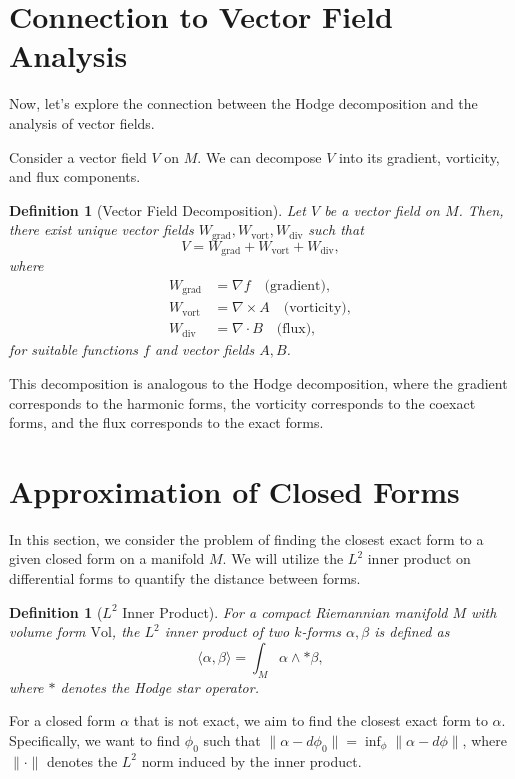 \documentclass[12pt]{article}
\newtheorem{definition}[theorem]{Definition}
\begin{document}
\section{Connection to Vector Field Analysis}
Now, let's explore the connection between the Hodge decomposition and the analysis of vector fields.

Consider a vector field $V$ on $M$. We can decompose $V$ into its gradient, vorticity, and flux components.

\begin{definition}[Vector Field Decomposition]
Let $V$ be a vector field on $M$. Then, there exist unique vector fields $W_{\text{grad}}, W_{\text{vort}}, W_{\text{div}}$ such that
\[
V = W_{\text{grad}} + W_{\text{vort}} + W_{\text{div}},
\]
where
\begin{align*}
W_{\text{grad}} &= \nabla f \quad \text{(gradient)}, \\
W_{\text{vort}} &= \nabla \times A \quad \text{(vorticity)}, \\
W_{\text{div}} &= \nabla \cdot B \quad \text{(flux)},
\end{align*}
for suitable functions $f$ and vector fields $A, B$.
\end{definition}

This decomposition is analogous to the Hodge decomposition, where the gradient corresponds to the harmonic forms, the vorticity corresponds to the coexact forms, and the flux corresponds to the exact forms.


\section{Approximation of Closed Forms}

In this section, we consider the problem of finding the closest exact form to a given closed form on a manifold $M$. We will utilize the $L^2$ inner product on differential forms to quantify the distance between forms.

\begin{definition}[$L^2$ Inner Product]
For a compact Riemannian manifold $M$ with volume form $\mathrm{Vol}$, the $L^2$ inner product of two $k$-forms $\alpha, \beta$ is defined as
\[
\langle \alpha, \beta \rangle = \int_M \alpha \wedge \ast \beta,
\]
where $\ast$ denotes the Hodge star operator.
\end{definition}

For a closed form $\alpha$ that is not exact, we aim to find the closest exact form to $\alpha$. Specifically, we want to find $\phi_0$ such that $\|\alpha - d\phi_0\| = \inf_{\phi}\|\alpha - d\phi\|$, where $\|\cdot\|$ denotes the $L^2$ norm induced by the inner product.
\end{document}
